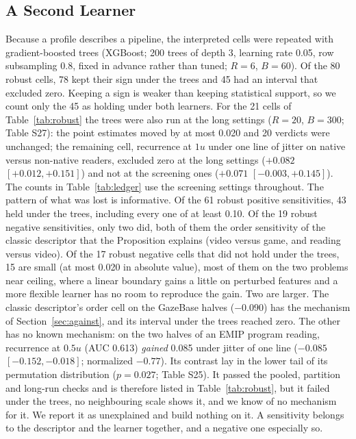 \subsection{A Second Learner}\label{sec:learners}
Because a profile describes a pipeline, the interpreted cells were repeated with gradient-boosted trees (XGBoost; 200 trees of depth 3, learning rate 0.05, row subsampling 0.8, fixed in advance rather than tuned; $R = 6$, $B = 60$). Of the 80 robust cells, 78 kept their sign under the trees and 45 had an interval that excluded zero. Keeping a sign is weaker than keeping statistical support, so we count only the 45 as holding under both learners. For the 21 cells of Table~\ref{tab:robust} the trees were also run at the long settings ($R = 20$, $B = 300$; Table S27): the point estimates moved by at most 0.020 and 20 verdicts were unchanged; the remaining cell, recurrence at $1u$ under one line of jitter on native versus non-native readers, excluded zero at the long settings ($+0.082$ $[+0.012, +0.151]$) and not at the screening ones ($+0.071$ $[-0.003, +0.145]$). The counts in Table~\ref{tab:ledger} use the screening settings throughout. The pattern of what was lost is informative. Of the 61 robust positive sensitivities, 43 held under the trees, including every one of at least 0.10. Of the 19 robust negative sensitivities, only two did, both of them the order sensitivity of the classic descriptor that the Proposition explains (video versus game, and reading versus video). Of the 17 robust negative cells that did not hold under the trees, 15 are small (at most 0.020 in absolute value), most of them on the two problems near ceiling, where a linear boundary gains a little on perturbed features and a more flexible learner has no room to reproduce the gain. Two are larger. The classic descriptor's order cell on the GazeBase halves ($-0.090$) has the mechanism of Section~\ref{sec:against}, and its interval under the trees reached zero. The other has no known mechanism: on the two halves of an EMIP program reading, recurrence at $0.5u$ (AUC 0.613) \emph{gained} 0.085 under jitter of one line ($-0.085$ $[-0.152, -0.018]$; normalized $-0.77$). Its contrast lay in the lower tail of its permutation distribution ($p = 0.027$; Table S25). It passed the pooled, partition and long-run checks and is therefore listed in Table~\ref{tab:robust}, but it failed under the trees, no neighbouring scale shows it, and we know of no mechanism for it. We report it as unexplained and build nothing on it. A sensitivity belongs to the descriptor and the learner together, and a negative one especially so.
